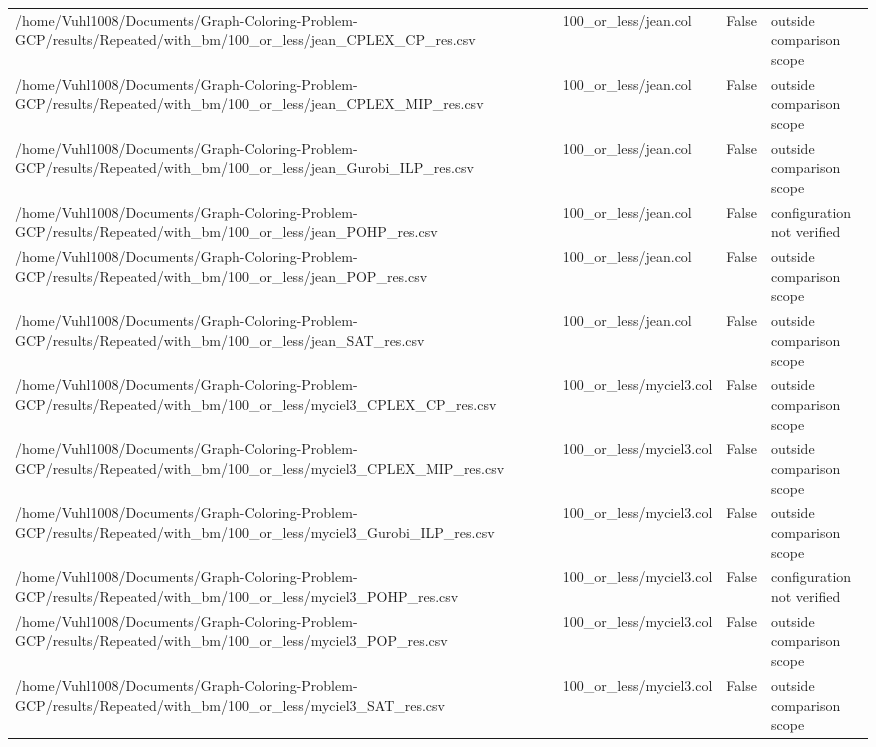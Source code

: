 \begin{table}[htbp]
\begin{tabular}{llll}
/home/Vuhl1008/Documents/Graph-Coloring-Problem-GCP/results/Repeated/with\_bm/100\_or\_less/jean\_CPLEX\_CP\_res.csv & 100\_or\_less/jean.col & False & outside comparison scope \\
/home/Vuhl1008/Documents/Graph-Coloring-Problem-GCP/results/Repeated/with\_bm/100\_or\_less/jean\_CPLEX\_MIP\_res.csv & 100\_or\_less/jean.col & False & outside comparison scope \\
/home/Vuhl1008/Documents/Graph-Coloring-Problem-GCP/results/Repeated/with\_bm/100\_or\_less/jean\_Gurobi\_ILP\_res.csv & 100\_or\_less/jean.col & False & outside comparison scope \\
/home/Vuhl1008/Documents/Graph-Coloring-Problem-GCP/results/Repeated/with\_bm/100\_or\_less/jean\_POHP\_res.csv & 100\_or\_less/jean.col & False & configuration not verified \\
/home/Vuhl1008/Documents/Graph-Coloring-Problem-GCP/results/Repeated/with\_bm/100\_or\_less/jean\_POP\_res.csv & 100\_or\_less/jean.col & False & outside comparison scope \\
/home/Vuhl1008/Documents/Graph-Coloring-Problem-GCP/results/Repeated/with\_bm/100\_or\_less/jean\_SAT\_res.csv & 100\_or\_less/jean.col & False & outside comparison scope \\
/home/Vuhl1008/Documents/Graph-Coloring-Problem-GCP/results/Repeated/with\_bm/100\_or\_less/myciel3\_CPLEX\_CP\_res.csv & 100\_or\_less/myciel3.col & False & outside comparison scope \\
/home/Vuhl1008/Documents/Graph-Coloring-Problem-GCP/results/Repeated/with\_bm/100\_or\_less/myciel3\_CPLEX\_MIP\_res.csv & 100\_or\_less/myciel3.col & False & outside comparison scope \\
/home/Vuhl1008/Documents/Graph-Coloring-Problem-GCP/results/Repeated/with\_bm/100\_or\_less/myciel3\_Gurobi\_ILP\_res.csv & 100\_or\_less/myciel3.col & False & outside comparison scope \\
/home/Vuhl1008/Documents/Graph-Coloring-Problem-GCP/results/Repeated/with\_bm/100\_or\_less/myciel3\_POHP\_res.csv & 100\_or\_less/myciel3.col & False & configuration not verified \\
/home/Vuhl1008/Documents/Graph-Coloring-Problem-GCP/results/Repeated/with\_bm/100\_or\_less/myciel3\_POP\_res.csv & 100\_or\_less/myciel3.col & False & outside comparison scope \\
/home/Vuhl1008/Documents/Graph-Coloring-Problem-GCP/results/Repeated/with\_bm/100\_or\_less/myciel3\_SAT\_res.csv & 100\_or\_less/myciel3.col & False & outside comparison scope \\

\end{tabular}
\end{table}
